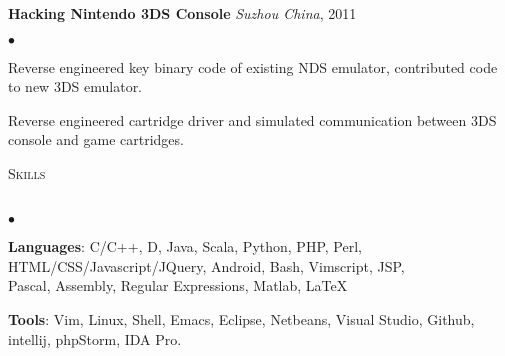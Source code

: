 \documentclass[11pt]{article}
\newcommand{\td}{\textasciitilde}
\newcommand{\lineunder}{\vspace*{-8pt} \\ \hspace*{-18pt} \hrulefill \\}
\newcommand{\header}[2]{{\hspace*{-15pt}\vspace*{6pt} \textsc{\large #1}\hfill{\footnotesize #2}} \vspace*{-6pt} \lineunder}
\newcommand{\URL}[1] {\textbf{\scriptsize #1}}
\newcommand{\SC}[1] {\URL{(#1)}}
\newcommand{\project}[4]{{ \textbf{#1} \emph{#2}, #3
    \ifthenelse{\isempty{#4}}{}{\hfill \SC{#4}\\}   }}
\newenvironment{achievements}{\begin{list}{$\bullet$}{\topsep 0pt \itemsep -2pt}}{\vspace*{4pt}\end{list}}
\begin{document}
\project{Hacking Nintendo 3DS Console}{Suzhou China}{2011}{}
    \begin{achievements}
    \item Reverse engineered key binary code of existing NDS emulator, contributed code to new 3DS emulator.
    \item Reverse engineered cartridge driver and simulated communication between 3DS console and game cartridges.
    \end{achievements}

\header{Skills}{}
\begin{achievements}
\item \textbf{Languages}: \textsf{C/C++, D, Java, Scala, Python, PHP, Perl, HTML/CSS/Javascript/JQuery, Android, Bash,
    Vimscript, JSP,  \\ \quad\quad\quad\quad\quad\quad Pascal, Assembly, Regular Expressions, Matlab, \LaTeX}
\item \textbf{Tools}: \textsf{Vim, Linux, Shell, Emacs, Eclipse, Netbeans, Visual Studio, Github, intellij, phpStorm, IDA Pro.}
\end{achievements}
\end{document}
